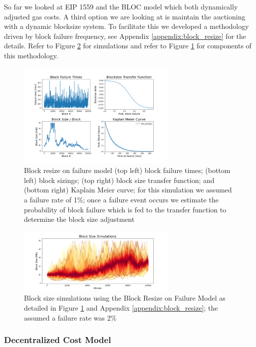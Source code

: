 \documentclass[peerreview]{ieeesyscoin}
\begin{document}
So far we looked at EIP 1559 and the BLOC model which both dynamically adjusted gas costs. A third option we are looking at is maintain the auctioning with a dynamic blocksize system. To facilitate this we developed a methodology driven by block failure frequency, see Appendix \ref{appendix:block_resize} for the details. Refer to Figure \ref{fig:blk_size_simulations} for simulations and refer to Figure \ref{fig:block_failure} for components of this methodology.

\begin{figure}[h!]
\includegraphics[width=3in]{img/block_failure.png}
\caption{Block resize on failure model (top left) block failure times; (bottom left) block sizings; (top right) block size transfer function; and (bottom right) Kaplain Meier curve; for this simulation we assumed a failure rate of 1\%; once a failure event occurs we estimate the probability of block failure which is fed to the transfer function to determine the block size adjustment} 
\label{fig:block_failure}
\end{figure} 

\begin{figure}[h!]
\includegraphics[width=3in]{img/blk_size_simulations.png}
\caption{Block size simulations using the Block Resize on Failure Model as detailed in Figure \ref{fig:block_failure} and Appendix \ref{appendix:block_resize}; the assumed a failure rate was 2\%} 
\label{fig:blk_size_simulations}
\end{figure} 

\subsubsection{Decentralized Cost Model}
\end{document}
